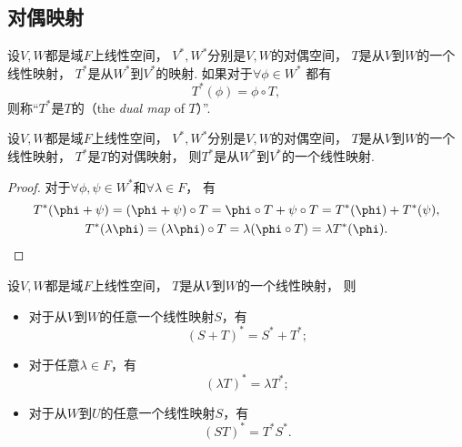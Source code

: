 \subsection{对偶映射}
\begin{definition}
设\(V,W\)都是域\(F\)上线性空间，
\(V^*,W^*\)分别是\(V,W\)的对偶空间，
\(T\)是从\(V\)到\(W\)的一个线性映射，
\(T^*\)是从\(W^*\)到\(V^*\)的映射.
如果对于\(\forall \phi \in W^*\)
都有\begin{equation*}
	T^*(\phi) = \phi \circ T,
\end{equation*}
则称“\(T^*\)是\(T\)的（the \emph{dual map} of \(T\)）”.
\end{definition}

\begin{proposition}
设\(V,W\)都是域\(F\)上线性空间，
\(V^*,W^*\)分别是\(V,W\)的对偶空间，
\(T\)是从\(V\)到\(W\)的一个线性映射，
\(T^*\)是\(T\)的对偶映射，
则\(T^*\)是从\(W^*\)到\(V^*\)的一个线性映射.
\begin{proof}
对于\(\forall \phi,\psi \in W^*\)和\(\forall \lambda \in F\)，
有\begin{gather*}
	T^*(\phi+\psi)
	= (\phi+\psi) \circ T
	= \phi \circ T + \psi \circ T
	= T^*(\phi) + T^*(\psi), \\
	T^*(\lambda\phi)
	= (\lambda\phi) \circ T
	= \lambda (\phi \circ T)
	= \lambda T^*(\phi).
	\qedhere
\end{gather*}
\end{proof}
\end{proposition}

\begin{property}
设\(V,W\)都是域\(F\)上线性空间，
\(T\)是从\(V\)到\(W\)的一个线性映射，
则\begin{itemize}
	\item 对于从\(V\)到\(W\)的任意一个线性映射\(S\)，有\begin{equation*}
		(S+T)^* = S^* + T^*;
	\end{equation*}
	\item 对于任意\(\lambda \in F\)，有\begin{equation*}
		(\lambda T)^* = \lambda T^*;
	\end{equation*}
	\item 对于从\(W\)到\(U\)的任意一个线性映射\(S\)，有\begin{equation*}
		(S T)^* = T^* S^*.
	\end{equation*}
\end{itemize}
\end{property}
